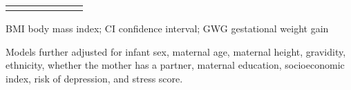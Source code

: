 \documentclass[10pt]{article}
\begin{document}
\begin{landscape}
\begin{table}
\begin{threeparttable}
\begin{tabular}{lcccccc}
\addlinespace[6pt]                                     
\bottomrule
\addlinespace[6pt]
\end{tabular}
\begin{tablenotes}
\item BMI body mass index; CI confidence interval; GWG gestational weight gain
\item Models further adjusted for infant sex, maternal age, maternal height, gravidity, ethnicity, whether the mother has a partner, maternal education, socioeconomic index, risk of depression, and stress score.
\end{tablenotes}

\end{threeparttable}
\end{table}
\end{landscape}
\end{document}
